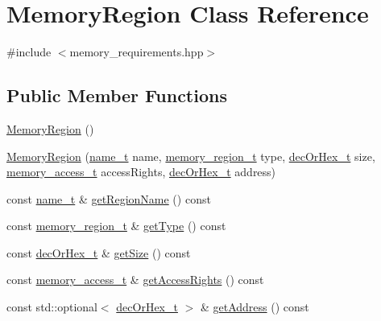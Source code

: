 \hypertarget{classMemoryRegion}{}\section{Memory\+Region Class Reference}
\label{classMemoryRegion}


{\ttfamily \#include $<$memory\+\_\+requirements.\+hpp$>$}

\subsection*{Public Member Functions}
\begin{DoxyCompactItemize}
\item 
\hyperlink{classMemoryRegion_a2cfe313fec204b9ae6010fb28bab02be}{Memory\+Region} ()
\item 
\hyperlink{classMemoryRegion_a7fa5ab5ab3defa36270571ad3e2a1b2d}{Memory\+Region} (\hyperlink{structname__t}{name\+\_\+t} name, \hyperlink{memory__requirements_8hpp_a306cba03fa0fb72d807fc29d19376ead}{memory\+\_\+region\+\_\+t} type, \hyperlink{general__types_8hpp_a0edc3a86ddf4aa205c6882b61cd7b4e9}{dec\+Or\+Hex\+\_\+t} size, \hyperlink{memory__requirements_8hpp_a2ac65df2063d231ce475db7ef11ef039}{memory\+\_\+access\+\_\+t} access\+Rights, \hyperlink{general__types_8hpp_a0edc3a86ddf4aa205c6882b61cd7b4e9}{dec\+Or\+Hex\+\_\+t} address)
\item 
const \hyperlink{structname__t}{name\+\_\+t} \& \hyperlink{classMemoryRegion_a9d62e8cea8d7064fe787994351bc06fd}{get\+Region\+Name} () const 
\item 
const \hyperlink{memory__requirements_8hpp_a306cba03fa0fb72d807fc29d19376ead}{memory\+\_\+region\+\_\+t} \& \hyperlink{classMemoryRegion_afb0f6a097108c5cb1e1d7f26b7258ae2}{get\+Type} () const 
\item 
const \hyperlink{general__types_8hpp_a0edc3a86ddf4aa205c6882b61cd7b4e9}{dec\+Or\+Hex\+\_\+t} \& \hyperlink{classMemoryRegion_a4fc497b2f396152830e493e2303f3629}{get\+Size} () const 
\item 
const \hyperlink{memory__requirements_8hpp_a2ac65df2063d231ce475db7ef11ef039}{memory\+\_\+access\+\_\+t} \& \hyperlink{classMemoryRegion_ae5df8d0b9a94e4e8ce3acb7a365e4722}{get\+Access\+Rights} () const 
\item 
const std\+::optional$<$ \hyperlink{general__types_8hpp_a0edc3a86ddf4aa205c6882b61cd7b4e9}{dec\+Or\+Hex\+\_\+t} $>$ \& \hyperlink{classMemoryRegion_aebbaa6c7baf7bb6fbf01cc6607587aaa}{get\+Address} () const 
\end{DoxyCompactItemize}


